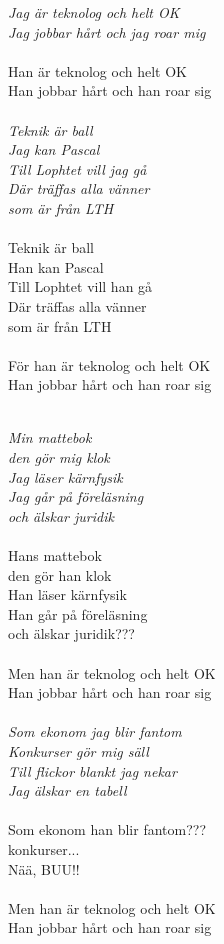 \noindent\textit{Jag är teknolog och helt OK\\
Jag jobbar hårt och jag roar mig}\\\\
\noindent Han är teknolog och helt OK\\
Han jobbar hårt och han roar sig\\\\
\noindent\textit{Teknik är ball\\
Jag kan Pascal\\
Till Lophtet vill jag gå\\
Där träffas alla vänner\\
som är från LTH}\\\\
\noindent Teknik är ball\\
Han kan Pascal\\
Till Lophtet vill han gå\\
Där träffas alla vänner\\
som är från LTH\\\\
\noindent För han är teknolog och helt OK\\
Han jobbar hårt och han roar sig\\\\


\newpage

\noindent\textit{Min mattebok \\
den gör mig klok\\
Jag läser kärnfysik\\
Jag går på föreläsning\\
och älskar juridik}\\\\
\noindent Hans mattebok\\
den gör han klok\\
Han läser kärnfysik\\
Han går på föreläsning\\
och älskar juridik???\\\\
\noindent Men han är teknolog och helt OK\\
Han jobbar hårt och han roar sig\\\\
\noindent\textit{Som ekonom jag blir fantom\\
Konkurser gör mig säll\\
Till flickor blankt jag nekar\\
Jag älskar en tabell}\\\\
\noindent Som ekonom han blir fantom???\\
konkurser...\\
Nää, BUU!!\\\\
\noindent Men han är teknolog och helt OK\\
Han jobbar hårt och han roar sig\\


